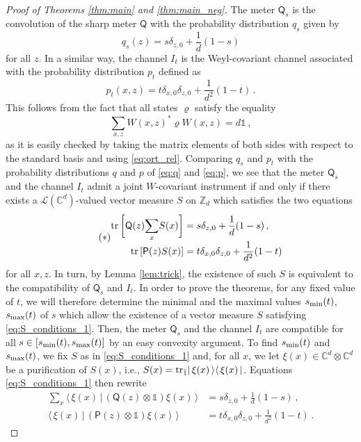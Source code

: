 \documentclass[12pt,reqno]{amsart}
\theoremstyle{definition}
\newcommand{\ip}[2]{\langle\,#1\,\vert\,#2\,\rangle} %
\newcommand{\kb}[2]{\vert\,#1\,\rangle\langle\,#2\,\vert} %
\newcommand{\tr}[1]{{\rm tr}\left[#1\right]} %
\newcommand{\ptr}[2]{{\rm tr}_{#1} #2} %
\newcommand{\id}{\mathds{1}} %
\newcommand{\Qo}{\mathsf{Q}}%
\newcommand{\Po}{\mathsf{P}}%
\newcommand{\rhoo}{\varrho} %
\newcommand{\Cb}{\mathbb{C}} %
\newcommand{\Zb}{\mathbb{Z}} %
\newcommand{\lc}[1]{\mathcal{L}(\Cb^{#1})} %
\begin{document}
\begin{proof}[Proof of Theorems \ref{thm:main} and \ref{thm:main_neg}]
The meter $\Qo_s$ is the convolution of the sharp meter $\Qo$ with the probability distribution $q_s$ given by
$$
q_s(z) = s\delta_{z,0} + \frac{1}{d}(1-s)
$$
for all $z$. In a similar way, the channel $I_t$ is the Weyl-covariant channel associated with the probability distribution $p_t$ defined as
$$
p_t(x,z) = t\delta_{x,0}\delta_{z,0} + \frac{1}{d^2}(1-t)\,.
$$
This follows from the fact that all states $\rhoo$ satisfy the equality
$$
\sum_{x,z} W(x,z)^*\rhoo W(x,z) = d\id\,,
$$
as it is easily checked by taking the matrix elements of both sides with respect to the standard basis and using \eqref{eq:ort_rel}. Comparing $q_s$ and $p_t$ with the probability distributions $q$ and $p$ of \eqref{eq:q} and \eqref{eq:p}, we see that the meter $\Qo_s$ and the channel $I_t$ admit a joint $W$-covariant instrument if and only if there exists a $\lc{d}$-valued vector measure $S$ on $\Zb_d$ which satisfies the two equations
\begin{equation}\tag{$\ast$}\label{eq:S_conditions_1}
\begin{aligned}
\tr{\vphantom{\bigg[}\Qo(z)\smash{\sum_x} S(x)} & = s\delta_{z,0} + \frac{1}{d}(1-s) \,,\\
\tr{\Po(z)S(x)} & = t\delta_{x,0}\delta_{z,0} + \frac{1}{d^2}(1-t)
\end{aligned}
\end{equation}
for all $x,z$. In turn, by Lemma \ref{lem:trick}, the existence of such $S$ is equivalent to the compatibility of $\Qo_s$ and $I_t$. In order to prove the theorems, for any fixed value of $t$, we will therefore determine the minimal and the maximal values $s_{\rm min}(t)$, $s_{\rm max}(t)$ of $s$ which allow the existence of a vector measure $S$ satisfying \eqref{eq:S_conditions_1}. Then, the  meter $\Qo_s$ and the channel $I_t$ are compatible for all $s\in [s_{\rm min}(t),s_{\rm max}(t)]$ by an easy convexity argument. To find $s_{\rm min}(t)$ and $s_{\rm max}(t)$, we fix $S$ as in \eqref{eq:S_conditions_1} and, for all $x$, we let $\xi(x)\in\Cb^d\otimes\Cb^d$ be a purification of $S(x)$, i.e., $S(x)=\ptr{\bar{1}}{\kb{\xi(x)}{\xi(x)}}$. Equations \eqref{eq:S_conditions_1} then rewrite
\begin{equation*}
\begin{aligned}
\sum_x \ip{\xi(x)}{(\Qo(z)\otimes\id)\xi(x)} & = s\delta_{z,0} + \frac{1}{d}(1-s) \,,\\
\ip{\xi(x)}{(\Po(z)\otimes\id)\xi(x)} & = t\delta_{x,0}\delta_{z,0} + \frac{1}{d^2}(1-t)\,.

\end{aligned}
\end{equation*}
\end{proof}
\end{document}
